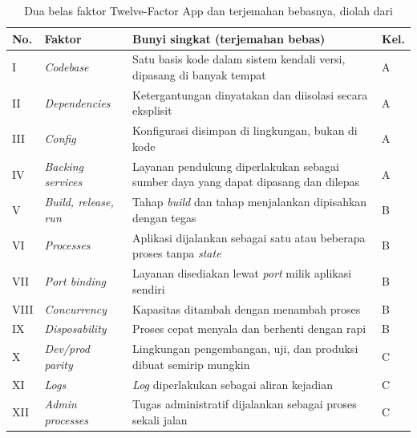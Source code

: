 \begin{table}[!htb]
  \centering
  \footnotesize
  \caption{Dua belas faktor Twelve-Factor App dan terjemahan bebasnya, diolah dari
           \cite{twelvefactor}}
  \label{tab:ch05-dua-belas}
  \begin{tabularx}{\textwidth}{>{\raggedright\arraybackslash}p{0.6cm}
    >{\raggedright\arraybackslash}p{2.5cm} >{\raggedright\arraybackslash}X
    >{\raggedright\arraybackslash}p{0.9cm}}
    \hline
    \textbf{No.} & \textbf{Faktor} & \textbf{Bunyi singkat (terjemahan bebas)} &
      \textbf{Kel.} \\
    \hline
    I & \textit{Codebase} & Satu basis kode dalam sistem kendali versi, dipasang di banyak
      tempat & A \\
    \hline
    II & \textit{Dependencies} & Ketergantungan dinyatakan dan diisolasi secara eksplisit
      & A \\
    \hline
    III & \textit{Config} & Konfigurasi disimpan di lingkungan, bukan di kode & A \\
    \hline
    IV & \textit{Backing services} & Layanan pendukung diperlakukan sebagai sumber daya
      yang dapat dipasang dan dilepas & A \\
    \hline
    V & \textit{Build, release, run} & Tahap \textit{build} dan tahap menjalankan dipisahkan
      dengan tegas & B \\
    \hline
    VI & \textit{Processes} & Aplikasi dijalankan sebagai satu atau beberapa proses tanpa
      \textit{state} & B \\
    \hline
    VII & \textit{Port binding} & Layanan disediakan lewat \textit{port} milik aplikasi
      sendiri & B \\
    \hline
    VIII & \textit{Concurrency} & Kapasitas ditambah dengan menambah proses & B \\
    \hline
    IX & \textit{Disposability} & Proses cepat menyala dan berhenti dengan rapi & B \\
    \hline
    X & \textit{Dev/prod parity} & Lingkungan pengembangan, uji, dan produksi dibuat
      semirip mungkin & C \\
    \hline
    XI & \textit{Logs} & \textit{Log} diperlakukan sebagai aliran kejadian & C \\
    \hline
    XII & \textit{Admin processes} & Tugas administratif dijalankan sebagai proses sekali
      jalan & C \\
    \hline
  \end{tabularx}
\end{table}

